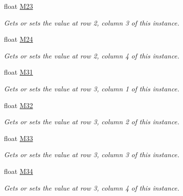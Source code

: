 \begin{DoxyCompactItemize}
float \hyperlink{struct_open_t_k_1_1_matrix4_a833d47673ced755298c9be945e198d63}{M23}
\begin{DoxyCompactList}\small\item\em Gets or sets the value at row 2, column 3 of this instance. \end{DoxyCompactList}\item 
float \hyperlink{struct_open_t_k_1_1_matrix4_a10cd1d863df4b0e82713451981b10cb3}{M24}
\begin{DoxyCompactList}\small\item\em Gets or sets the value at row 2, column 4 of this instance. \end{DoxyCompactList}\item 
float \hyperlink{struct_open_t_k_1_1_matrix4_ad246a5c283910c4c0d449bbda48ce9f4}{M31}
\begin{DoxyCompactList}\small\item\em Gets or sets the value at row 3, column 1 of this instance. \end{DoxyCompactList}\item 
float \hyperlink{struct_open_t_k_1_1_matrix4_af6e28741c160512d08a715bb26b704cf}{M32}
\begin{DoxyCompactList}\small\item\em Gets or sets the value at row 3, column 2 of this instance. \end{DoxyCompactList}\item 
float \hyperlink{struct_open_t_k_1_1_matrix4_a1ae9d90f8241dd5bc8223409256bf782}{M33}
\begin{DoxyCompactList}\small\item\em Gets or sets the value at row 3, column 3 of this instance. \end{DoxyCompactList}\item 
float \hyperlink{struct_open_t_k_1_1_matrix4_a23fec879bedcd2af4439b5f6193be2df}{M34}
\begin{DoxyCompactList}\small\item\em Gets or sets the value at row 3, column 4 of this instance. \end{DoxyCompactList}\item 

\end{DoxyCompactItemize}
